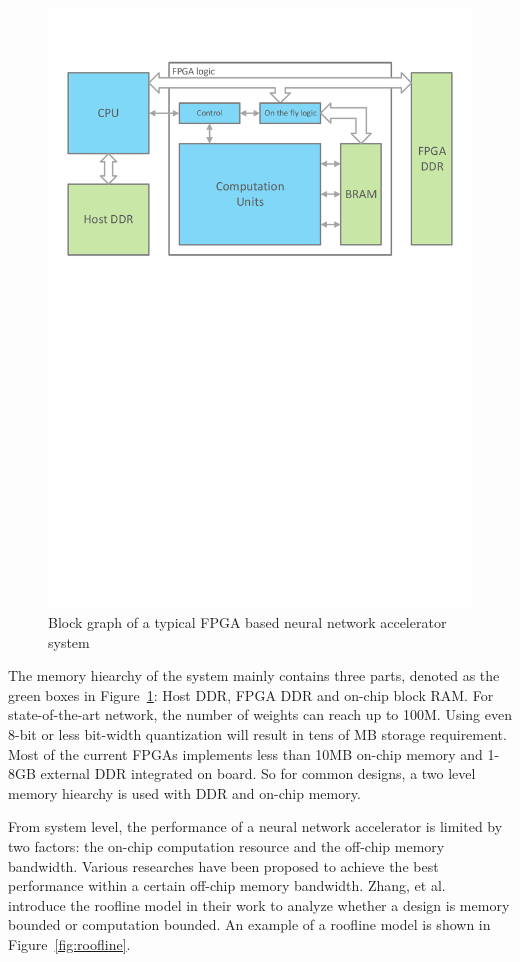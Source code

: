 \begin{figure}[t]
    \centering
    \includegraphics[width=0.8\columnwidth]{fig/sys.pdf}
    \caption{Block graph of a typical FPGA based neural network accelerator system}
    \label{fig:sys}
\end{figure}

The memory hiearchy of the system mainly contains three parts, denoted as the green boxes in Figure~\ref{fig:sys}: Host DDR, FPGA DDR and on-chip block RAM. For state-of-the-art network, the number of weights can reach up to 100M. Using even 8-bit or less bit-width quantization will result in tens of MB storage requirement. Most of the current FPGAs implements less than 10MB on-chip memory and 1-8GB external DDR integrated on board. So for common designs, a two level memory hiearchy is used with DDR and on-chip memory. 

From system level, the performance of a neural network accelerator is limited by two factors: the on-chip computation resource and the off-chip memory bandwidth. Various researches have been proposed to achieve the best performance within a certain off-chip memory bandwidth. Zhang, et al.~\cite{zhang2015optimizing} introduce the roofline model in their work to analyze whether a design is memory bounded or computation bounded. An example of a roofline model is shown in Figure~\ref{fig:roofline}.

